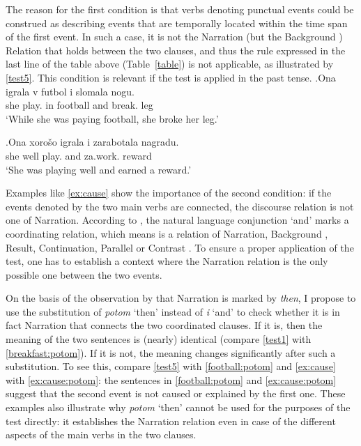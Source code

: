 The reason for the first condition is that verbs denoting punctual events could be construed as describing events that are temporally located within the time span of the first event. In such a case, it is not the Narration (but the Background ) Relation that holds between the two clauses, and thus the rule expressed in the last line of the table above (Table~\ref{table}) is not applicable, as illustrated by \ref{test5}. This condition is relevant if the test is applied in the past  tense.
\exg.\label{test5}Ona igrala\textsuperscript{\IPF} v futbol i slomala\textsuperscript{\PF} nogu.\\
she play. in football and break. leg\\
\trans `While she was paying football, she broke her leg.'

\exg.\label{ex:cause}Ona xoro\v{s}o igrala\textsuperscript{\IPF} i zarabotala\textsuperscript{\PF} nagradu.\\
she well play. and za.work. reward\\
\trans `She was playing well and earned a reward.'

Examples like \ref{ex:cause} show the importance of the second condition: if the events denoted by the two main verbs are connected, the discourse relation  is not one of Narration. According to \citet{Txurruka:03}, the natural language conjunction  `and' marks a coordinating relation, which means is a relation of Narration, Background , Result, Continuation, Parallel or Contrast \citep{Asher:05}. To ensure a proper application of the test, one has to establish a context   where the Narration relation  is the only possible one between the two events. 

On the basis of the observation by \citet{Txurruka:03} that Narration is marked by \textit{then}, I propose to use the substitution of \textit{potom} `then' instead of \textit{i} `and' to check whether it is in fact Narration that connects the two coordinated clauses. If it is, then the meaning of the two sentences is (nearly) identical (compare \ref{test1} with \ref{breakfast:potom}). If it is not, the meaning changes significantly after such a substitution. To see this, compare \ref{test5} with \ref{football:potom} and \ref{ex:cause} with \ref{ex:cause:potom}: the sentences in \ref{football:potom} and \ref{ex:cause:potom} suggest that the second event is not caused or explained by the first one. These examples also illustrate why \textit{potom} `then' cannot be used for the purposes of the test directly: it establishes the Narration relation  even in case of the different aspects of the main verbs in the two clauses.

